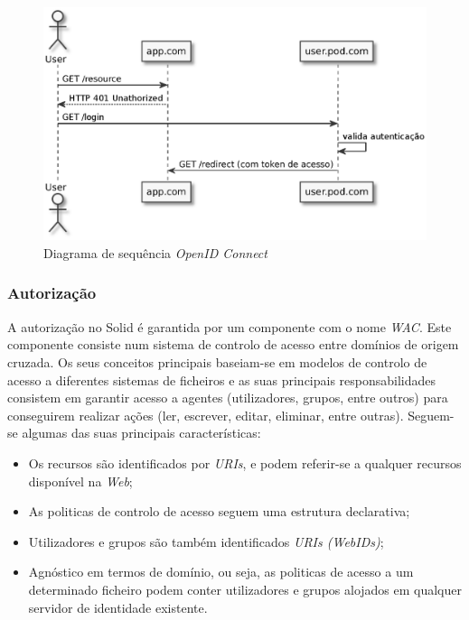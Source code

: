 \begin{figure}[H]
    \centering
    \includegraphics[width=0.8 \textwidth]{figures/open_id_connect_sd.eps}
    \caption{Diagrama de sequência \emph{OpenID Connect}}
    \label{open-id-connect-sequence-diagram}
\end{figure}

\subsubsection*{Autorização}
A autorização no Solid é garantida por um componente com o nome \emph{\acrfull{WAC}}. Este componente consiste num sistema de controlo de acesso entre domínios de origem cruzada. Os seus conceitos principais baseiam-se em modelos de controlo de acesso a diferentes sistemas de ficheiros e as suas principais responsabilidades consistem em garantir acesso a agentes (utilizadores, grupos, entre outros) para conseguirem realizar ações (ler, escrever, editar, eliminar, entre outras)\cite{solid_web_access_control}.
Seguem-se algumas das suas principais características:
\begin{itemize}
    \item Os recursos são identificados por \emph{URIs}, e podem referir-se a qualquer recursos disponível na \emph{Web};
    \item As politicas de controlo de acesso seguem uma estrutura declarativa;
    \item Utilizadores e grupos são também identificados \emph{URIs (WebIDs)};
    \item Agnóstico em termos de domínio, ou seja, as politicas de acesso a um determinado ficheiro podem conter utilizadores e grupos alojados em qualquer servidor de identidade existente.
\end{itemize}

